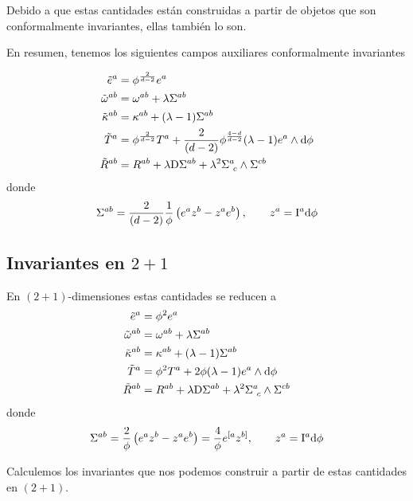 Debido a que estas cantidades están construidas a partir de objetos que son conformalmente invariantes, ellas también lo son.

En resumen, tenemos los siguientes campos auxiliares conformalmente invariantes
\begin{tcolorbox}
\begin{align}
    \Tilde{e}^{a}&=\phi^\frac{2}{d-2} e^{a}\\
    \Tilde{\omega}^{ab}&=\omega^{ab}+\lambda\Sigma ^{ab}\\
    \Tilde{\kappa}^{ab}&=\kappa^{ab}+(\lambda-1)\Sigma ^{ab}\\
    \tilde{T}^{a}&=\phi^\frac{2}{d-2}T^{a}+\frac{2}{(d-2)}\phi^\frac{4-d}{d-2} (\lambda-1)e^{a}\wedge\dd\phi\\
    \Tilde{R}^{ab}&=R^{ab}+\lambda \mathrm{D} \Sigma^{ab}+\lambda^2\Sigma^{a}_{~c}\wedge\Sigma^{cb}
\end{align}
donde
\begin{align}
  \Sigma^{ab}=\frac{2}{(d-2)}\frac{1}{\phi}\left(e^{a}z^b-z^{a}e^b\right),\qquad z^{a}=\mathrm{I}^{a}\dd\phi
\end{align}
\end{tcolorbox}

\subsection{Invariantes en $2+1$}
En $(2+1)$-dimensiones estas cantidades se reducen a
\begin{align}
    \Tilde{e}^{a}&=\phi^2 e^{a}\\
    \Tilde{\omega}^{ab}&=\omega^{ab}+\lambda\Sigma ^{ab}\\
    \Tilde{\kappa}^{ab}&=\kappa^{ab}+(\lambda-1)\Sigma ^{ab}\\
    \tilde{T}^{a}&=\phi^2T^{a}+2\phi (\lambda-1)e^{a}\wedge\dd\phi\\
    \Tilde{R}^{ab}&=R^{ab}+\lambda \mathrm{D} \Sigma^{ab}+\lambda^2\Sigma^{a}_{~c}\wedge\Sigma^{cb}
\end{align}
donde
\begin{align}
  \Sigma^{ab}=\frac{2}{\phi}\left(e^{a}z^b-z^{a}e^b\right)=\frac{4}{\phi}e^{[a}z^{b]} ,\qquad z^{a}=\mathrm{I}^{a}\dd\phi
\end{align}


Calculemos los invariantes que nos podemos construir a partir de estas cantidades en $(2+1)$. 

